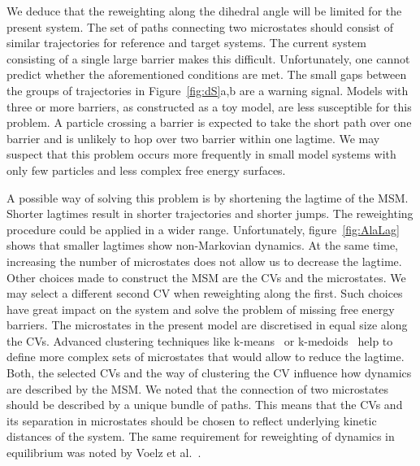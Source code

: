We deduce that the reweighting along the dihedral angle will be limited for the present system. The set of paths connecting two microstates should consist of similar trajectories for reference and target systems.  The current system consisting of a single large barrier makes this difficult. Unfortunately, one cannot predict whether the aforementioned conditions are met. The small gaps between the groups of trajectories in Figure~\ref{fig:dS}a,b are a warning signal. Models with three or more barriers, as constructed as a toy model, are less susceptible for this problem. A particle crossing a barrier is expected to take the short path over one barrier and is unlikely to hop over two barrier within one lagtime. We may suspect that this problem occurs more frequently in small model systems with only few particles and less complex free energy surfaces. 

A possible way of solving this problem is by shortening the lagtime of the MSM. Shorter lagtimes result in shorter trajectories and shorter jumps. The reweighting procedure could be applied in a wider range. Unfortunately, figure~\ref{fig:AlaLag} shows that smaller lagtimes show non-Markovian dynamics. At the same time, increasing the number of microstates does not allow us to decrease the lagtime. Other choices made to construct the MSM are the CVs and the microstates. We may select a different second CV when reweighting along the first. Such choices have great impact on the system and solve the problem of missing free energy barriers.  The microstates in the present model are discretised in equal size along the CVs. Advanced clustering techniques like k-means~\cite{likas2003global} or k-medoids~\cite{park2009simple} help to define more complex sets of microstates that would allow to reduce the lagtime. Both, the selected CVs and the way of clustering the CV influence how dynamics are described by the MSM. We noted that the connection of two microstates should be described by a unique bundle of paths. This means that the CVs and its separation in microstates should be chosen to reflect underlying kinetic distances of the system. The same requirement for reweighting of dynamics in equilibrium was noted by Voelz et al.~\cite{wan2016maximum}.

